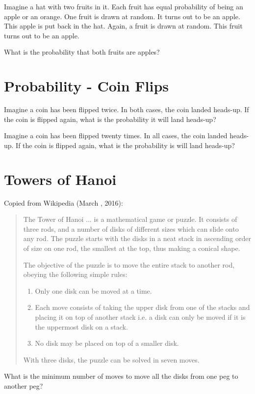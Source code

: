\documentclass[letterpaper, 11pt]{report}
\numberwithin{equation}{section}
\begin{document}
			
			Imagine a hat with two fruits in it.
			Each fruit has equal probability of being an apple or an orange.
			One fruit is drawn at random.
			It turns out to be an apple.
			This apple is put back in the hat.
			Again, a fruit is drawn at random.
			This fruit turns out to be an apple.
			
			What is the probability that both fruits are apples?
			
			
		\section{Probability - Coin Flips}
			
			
			Imagine a coin has been flipped twice.
			In both cases, the coin landed heads-up.
			If the coin is flipped again, what is the probability it will land heads-up?
			
			Imagine a coin has been flipped twenty times.
			In all cases, the coin landed heads-up.
			If the coin is flipped again, what is the probability is will land heads-up?
			
			
		\section{Towers of Hanoi}
			
			
			Copied from Wikipedia (March , 2016):
			\begin{quote}
				The Tower of Hanoi ... is a mathematical game or puzzle. It consists of three rods, and a number of disks of different sizes which can slide onto any rod. The puzzle starts with the disks in a neat stack in ascending order of size on one rod, the smallest at the top, thus making a conical shape.
				
				The objective of the puzzle is to move the entire stack to another rod, obeying the following simple rules:
				\begin{enumerate}
					\item Only one disk can be moved at a time.
					\item Each move consists of taking the upper disk from one of the stacks and placing it on top of another stack i.e. a disk can only be moved if it is the uppermost disk on a stack.
					\item No disk may be placed on top of a smaller disk.
				\end{enumerate}
				With three disks, the puzzle can be solved in seven moves.
			\end{quote}
			
			
			What is the minimum number of moves to move all the disks from one peg to another peg?
	
\end{document}
